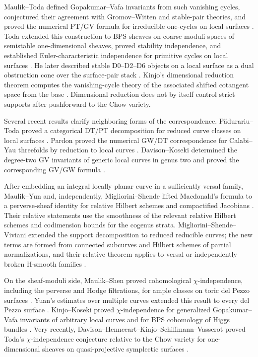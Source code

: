 \documentclass[11pt,reqno]{amsart}
\theoremstyle{definition}
\begin{document}
Maulik--Toda
defined Gopakumar--Vafa invariants from such vanishing cycles, conjectured
their agreement with Gromov--Witten and stable-pair theories, and proved the
numerical PT/GV formula for irreducible one-cycles on local surfaces
\cite{MaulikToda}.  Toda extended this construction to BPS sheaves on coarse
moduli spaces of semistable one-dimensional sheaves, proved stability
independence, and established Euler-characteristic independence for
primitive cycles on local surfaces \cite{TodaGVWallCrossing}.  He later
described stable D0--D2--D6 objects on a local surface as a dual obstruction
cone over the surface-pair stack \cite{TodaLocal}.  Kinjo's dimensional
reduction theorem computes the vanishing-cycle theory of the associated
shifted cotangent space from the base \cite{Kinjo}.  Dimensional reduction
does not by itself control strict supports after pushforward to the Chow
variety.

Several recent results clarify neighboring forms of the correspondence.
P\u{a}durariu--Toda proved a categorical DT/PT decomposition for reduced
curve classes on local surfaces \cite{PadurariuToda}.  Pardon proved the
numerical GW/DT correspondence for Calabi--Yau threefolds by reduction to
local curves \cite{Pardon}.  Davison--Koseki determined the degree-two GV
invariants of generic local curves in genus two and proved the corresponding
GV/GW formula \cite{DavisonKoseki}.

After embedding an integral locally planar curve in a sufficiently versal
family, Maulik--Yun and, independently, Migliorini--Shende lifted
Macdonald's formula to a perverse-sheaf identity for relative Hilbert
schemes and compactified Jacobians \cite{MaulikYun,MiglioriniShende}.
Their relative statements use the smoothness of the relevant relative
Hilbert schemes and codimension bounds for the cogenus strata.
Migliorini--Shende--Viviani
extended the support decomposition to reduced reducible curves; the new
terms are formed from connected subcurves and Hilbert schemes of partial
normalizations, and their relative theorem applies to versal or
independently broken H-smooth families \cite{MSV}.

On the sheaf-moduli side, Maulik--Shen proved cohomological
$\chi$-independence, including the perverse and Hodge filtrations, for ample
classes on toric del Pezzo surfaces \cite{MaulikShen}.  Yuan's estimates over
multiple curves extended this result to every del Pezzo surface
\cite{YuanNonreduced}.  Kinjo--Koseki proved $\chi$-independence for
generalized Gopakumar--Vafa invariants of arbitrary local curves and for BPS
cohomology of Higgs bundles \cite{KinjoKoseki}.  Very recently,
Davison--Hennecart--Kinjo--Schiffmann--Vasserot proved Toda's
$\chi$-independence conjecture relative to the Chow variety for
one-dimensional sheaves on quasi-projective symplectic surfaces
\cite{DavisonHennecartKinjoSchiffmannVasserot}.
\end{document}

